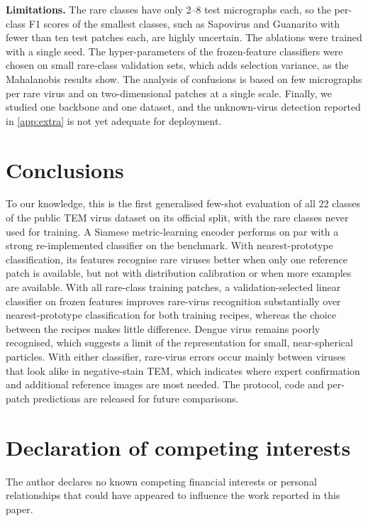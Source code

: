 \documentclass[preprint,review,12pt]{elsarticle}
\begin{document}
\textbf{Limitations.} The rare classes have only 2--8 test micrographs each, so the per-class F1 scores of the smallest classes, such as Sapovirus and Guanarito with fewer than ten test patches each, are highly uncertain. The ablations were trained with a single seed. The hyper-parameters of the frozen-feature classifiers were chosen on small rare-class validation sets, which adds selection variance, as the Mahalanobis results show. The analysis of confusions is based on few micrographs per rare virus and on two-dimensional patches at a single scale. Finally, we studied one backbone and one dataset, and the unknown-virus detection reported in \ref{app:extra} is not yet adequate for deployment.

\section{Conclusions}

To our knowledge, this is the first generalised few-shot evaluation of all 22 classes of the public TEM virus dataset on its official split, with the rare classes never used for training. A Siamese metric-learning encoder performs on par with a strong re-implemented classifier on the benchmark. With nearest-prototype classification, its features recognise rare viruses better when only one reference patch is available, but not with distribution calibration or when more examples are available. With all rare-class training patches, a validation-selected linear classifier on frozen features improves rare-virus recognition substantially over nearest-prototype classification for both training recipes, whereas the choice between the recipes makes little difference. Dengue virus remains poorly recognised, which suggests a limit of the representation for small, near-spherical particles. With either classifier, rare-virus errors occur mainly between viruses that look alike in negative-stain TEM, which indicates where expert confirmation and additional reference images are most needed. The protocol, code and per-patch predictions are released for future comparisons.

\section*{Declaration of competing interests}
The author declares no known competing financial interests or personal relationships that could have appeared to influence the work reported in this paper.
\end{document}
